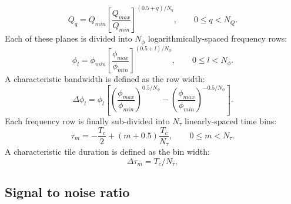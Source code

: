 \begin{equation}
  Q_q = Q_{min}\left[ \frac{Q_{max}}{Q_{min}}\right]^{(0.5+q)/N_q}, \qquad 0\le q < N_Q.
  \label{eq:q}
\end{equation}
Each of these planes is divided into $N_\phi$ logarithmically-spaced frequency rows:
\begin{equation}
  \phi_l = \phi_{min}\left[ \frac{\phi_{max}}{\phi_{min}}\right]^{(0.5+l)/N_\phi}, \qquad 0\le l < N_\phi.
  \label{eq:phi}
\end{equation}
A characteristic bandwidth is defined as the row width:
\begin{equation}
  \Delta\phi_l = \phi_{l} \left[ \left(\frac{\phi_{max}}{\phi_{min}}\right)^{0.5/N_\phi} - \left(\frac{\phi_{max}}{\phi_{min}}\right)^{-0.5/N_\phi} \right].
  \label{eq:dphi}
\end{equation}
Each frequency row is finally sub-divided into $N_\tau$ linearly-spaced time bins:
\begin{equation}
  \tau_m = -\frac{T_c}{2}+(m+0.5)\frac{T_c}{N_\tau}, \qquad 0\le m < N_\tau.
  \label{eq:tau}
\end{equation}
A characteristic tile duration is defined as the bin width:
\begin{equation}
  \Delta\tau_m = T_c / N_\tau,
  \label{eq:dtau}
\end{equation}

\subsection{Signal to noise ratio} \label{sec:analysis:snr}

